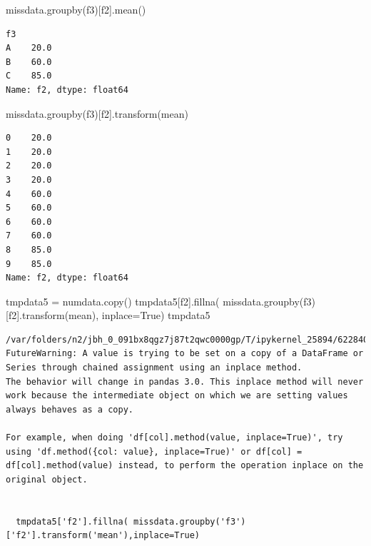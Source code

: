 \documentclass[
  a4paper,
  DIV=11,
  numbers=noendperiod]{scrreprt}
\newenvironment{Shaded}{\begin{snugshade}}{\end{snugshade}}
\newcommand{\NormalTok}[1]{\textcolor[rgb]{0.00,0.23,0.31}{#1}}
\newcommand{\OperatorTok}[1]{\textcolor[rgb]{0.37,0.37,0.37}{#1}}
\newcommand{\StringTok}[1]{\textcolor[rgb]{0.13,0.47,0.30}{#1}}
\newcommand{\VariableTok}[1]{\textcolor[rgb]{0.07,0.07,0.07}{#1}}
\begin{document}
\begin{Shaded}
\begin{Highlighting}[]
\NormalTok{missdata.groupby(}\StringTok{\textquotesingle{}f3\textquotesingle{}}\NormalTok{)[}\StringTok{\textquotesingle{}f2\textquotesingle{}}\NormalTok{].mean()}
\end{Highlighting}
\end{Shaded}

\begin{verbatim}
f3
A    20.0
B    60.0
C    85.0
Name: f2, dtype: float64
\end{verbatim}

\begin{Shaded}
\begin{Highlighting}[]
\NormalTok{missdata.groupby(}\StringTok{\textquotesingle{}f3\textquotesingle{}}\NormalTok{)[}\StringTok{\textquotesingle{}f2\textquotesingle{}}\NormalTok{].transform(}\StringTok{\textquotesingle{}mean\textquotesingle{}}\NormalTok{)}
\end{Highlighting}
\end{Shaded}

\begin{verbatim}
0    20.0
1    20.0
2    20.0
3    20.0
4    60.0
5    60.0
6    60.0
7    60.0
8    85.0
9    85.0
Name: f2, dtype: float64
\end{verbatim}

\begin{Shaded}
\begin{Highlighting}[]
\NormalTok{tmpdata5 }\OperatorTok{=}\NormalTok{ numdata.copy()}
\NormalTok{tmpdata5[}\StringTok{\textquotesingle{}f2\textquotesingle{}}\NormalTok{].fillna( missdata.groupby(}\StringTok{\textquotesingle{}f3\textquotesingle{}}\NormalTok{)[}\StringTok{\textquotesingle{}f2\textquotesingle{}}\NormalTok{].transform(}\StringTok{\textquotesingle{}mean\textquotesingle{}}\NormalTok{), inplace}\OperatorTok{=}\VariableTok{True}\NormalTok{)}
\NormalTok{tmpdata5}
\end{Highlighting}
\end{Shaded}

\begin{verbatim}
/var/folders/n2/jbh_0_091bx8qgz7j87t2qwc0000gp/T/ipykernel_25894/622840210.py:2: FutureWarning: A value is trying to be set on a copy of a DataFrame or Series through chained assignment using an inplace method.
The behavior will change in pandas 3.0. This inplace method will never work because the intermediate object on which we are setting values always behaves as a copy.

For example, when doing 'df[col].method(value, inplace=True)', try using 'df.method({col: value}, inplace=True)' or df[col] = df[col].method(value) instead, to perform the operation inplace on the original object.


  tmpdata5['f2'].fillna( missdata.groupby('f3')['f2'].transform('mean'),inplace=True)
\end{verbatim}
\end{document}
